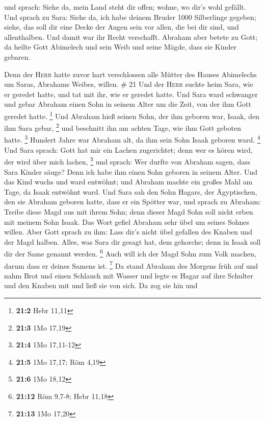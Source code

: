  und sprach: Siehe da, mein Land steht dir offen; wohne,
wo dir's wohl gefällt.  Und sprach zu Sara: Siehe da, ich
habe deinem Bruder 1000 Silberlinge gegeben; siehe, das soll dir eine
Decke der Augen sein vor allen, die bei dir sind, und allenthalben. Und
damit war ihr Recht verschafft.  Abraham aber betete zu
Gott; da heilte Gott Abimelech und sein Weib und seine Mägde, dass sie
Kinder gebaren.

 Denn der \textsc{Herr} hatte zuvor hart verschlossen
alle Mütter des Hauses Abimelechs um Saras, Abrahams Weibes, willen. \#
21  Und der \textsc{Herr} suchte heim Sara, wie er geredet
hatte, und tat mit ihr, wie er geredet hatte.  Und Sara
ward schwanger und gebar Abraham einen Sohn in seinem Alter um die Zeit,
von der ihm Gott geredet hatte. \footnote{\textbf{21:2} Hebr 11,11}
 Und Abraham hieß seinen Sohn, der ihm geboren war, Isaak,
den ihm Sara gebar, \footnote{\textbf{21:3} 1Mo 17,19} 
und beschnitt ihn am achten Tage, wie ihm Gott geboten hatte.
\footnote{\textbf{21:4} 1Mo 17,11-12}  Hundert Jahre war
Abraham alt, da ihm sein Sohn Isaak geboren ward. \footnote{\textbf{21:5}
  1Mo 17,17; Röm 4,19}  Und Sara sprach: Gott hat mir ein
Lachen zugerichtet; denn wer es hören wird, der wird über mich lachen,
\footnote{\textbf{21:6} 1Mo 18,12}  und sprach: Wer durfte
von Abraham sagen, dass Sara Kinder säuge? Denn ich habe ihm einen Sohn
geboren in seinem Alter.  Und das Kind wuchs und ward
entwöhnt; und Abraham machte ein großes Mahl am Tage, da Isaak entwöhnt
ward.  Und Sara sah den Sohn Hagars, der Ägyptischen, den
sie Abraham geboren hatte, dass er ein Spötter war,  und
sprach zu Abraham: Treibe diese Magd aus mit ihrem Sohn; denn dieser
Magd Sohn soll nicht erben mit meinem Sohn Isaak.  Das
Wort gefiel Abraham sehr übel um seines Sohnes willen. 
Aber Gott sprach zu ihm: Lass dir's nicht übel gefallen des Knaben und
der Magd halben. Alles, was Sara dir gesagt hat, dem gehorche; denn in
Isaak soll dir der Same genannt werden. \footnote{\textbf{21:12} Röm
  9,7-8; Hebr 11,18}  Auch will ich der Magd Sohn zum
Volk machen, darum dass er deines Samens ist. \footnote{\textbf{21:13}
  1Mo 17,20}  Da stand Abraham des Morgens früh auf und
nahm Brot und einen Schlauch mit Wasser und legte es Hagar auf ihre
Schulter und den Knaben mit und ließ sie von sich. Da zog sie hin und
